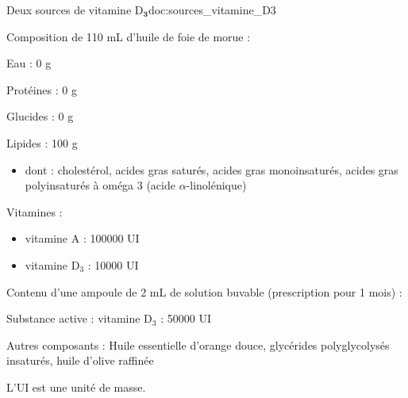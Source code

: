 \begin{doc}{Deux sources de vitamine D$_\mathbf{3}$}{doc:sources_vitamine_D3}
  \begin{center}
  \end{center}
  \vspace*{-12pt}
  Composition de 110 mL d'huile de foie de morue :
  \begin{listePoints}
    \item Eau : 0 g
    \item Protéines : 0 g
    \item Glucides : 0 g
    \item Lipides : 100 g
    \begin{itemize}
      \item dont : cholestérol, acides gras saturés, acides gras monoinsaturés, acides gras polyinsaturés à oméga 3 (acide $\alpha$-linolénique)
    \end{itemize}
    \item Vitamines :
    \begin{itemize}
      \item vitamine A :  \num{100 000} UI
      \item vitamine D$_3$ : \num{10 000 } UI
    \end{itemize}
  \end{listePoints}
  
  \begin{center}
  \end{center}
  \vspace*{-12pt}
  Contenu d'une ampoule de 2 mL de solution buvable (prescription pour 1 mois) :
  \begin{listePoints}
    \item Substance active : vitamine D$_3$ : \num{50 000} UI
    \item Autres composants : Huile essentielle d'orange douce, glycérides polyglycolysés insaturés, huile d'olive raffinée
  \end{listePoints}
  L'UI est une unité de masse.
\end{doc}



